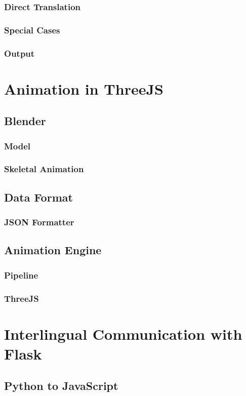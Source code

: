 \documentclass[12pt]{ociamthesis}  %
\begin{document}
		\subsubsection{Direct Translation}
		\subsubsection{Special Cases}
		\subsubsection{Output}
	
\section{Animation in ThreeJS}
	\subsection{Blender}
		\subsubsection{Model}
		\subsubsection{Skeletal Animation}
	\subsection{Data Format}
		\subsubsection{JSON Formatter}
	\subsection{Animation Engine}
		\subsubsection{Pipeline}
		\subsubsection{ThreeJS}
	
\section{Interlingual Communication with Flask}
	\subsection{Python to JavaScript}
\end{document}
